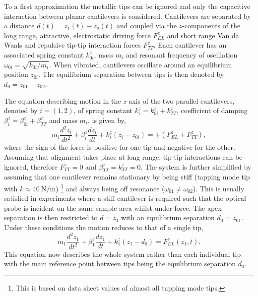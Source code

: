 \documentclass{article}
\begin{document}
To a first approximation the metallic tips can be ignored and only the capacitive interaction between planar cantilevers is considered. Cantilevers are separated by a distance $d(t) = z_1(t) - z_2(t)$ and coupled via the $z$-components of the long range, attractive, electrostatic driving force $F_{EL}^z$ and short range  Van da Waals and repulsive tip-tip interaction forces $F_{TT}^z$. Each cantilever has an associated spring constant $k_{0i}^z$, mass $m_i$ and resonant frequency of oscillation $\omega_{0i} = \sqrt{k_{0i}/m_i}$. When vibrated, cantilevers oscillate around an equilibrium position $z_{0i}$. The equilibrium separation between tips is then denoted by $d_0 = z_{01} - z_{02}$.

The equation describing motion in the $z$-axis of the two parallel cantilevers, denoted by $i=(1,2)$, of spring constant $k_i^z=k_{0i}^z+k_{TT}^z$, coefficient of damping $\beta_i^z=\beta_{0i}^z+\beta_{TT}^z$ and mass $m_i$, is given by,
\begin{equation}
	m_i\frac{d^2z_i}{dt^2}+\beta_i^z\frac{dz_i}{dt}+k_i^z\left(z_i-z_{0i}\right)=\pm\left(F_{EL}^z+F_{TT}^z\right),
\end{equation}
where the sign of the force is positive for one tip and negative for the other.
Assuming that alignment takes place at long range, tip-tip interactions can be ignored, therefore $F_{TT}^z = 0$ and $\beta_{TT}^{z} = k_{TT}^{z} = 0$. The system is further simplified by assuming that one cantilever remains stationary by being stiff (tapping mode tip with $k\approx\SI{40}{\newton\per\metre}$)%
\footnote{This is based on data sheet values of almost all tapping mode tips.}
and always being off resonance ($\omega_{01} \neq \omega_{02}$). This is usually satisfied in experiments where a stiff cantilever is required such that the optical probe is incident on the same sample area whilst under force. The apex separation is then restricted to $d=z_1$ with an equilibrium separation $d_0 = z_{01}$. Under these conditions the motion reduces to that of a single tip,
\begin{equation}
	m_1\frac{d^2z_1}{dt^2}+\beta_1^z\frac{dz_1}{dt}+k_1^z\left(z_1-d_0\right) = F_{EL}^z(z_1, t).
	\label{eq:simple_eom}
\end{equation}
This equation now describes the whole system rather than each individual tip with the main reference point between tips being the equilibrium separation $d_0$.
\end{document}
